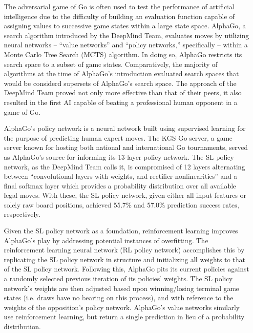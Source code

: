 \documentclass[12pt]{article}
\begin{document}
The adversarial game of Go is often used to test the performance of artificial
intelligence due to the difficulty of building an evaluation function capable
of assigning values to successive game states within a large state space. 
AlphaGo, a search algorithm introduced by the DeepMind Team, evaluates moves by
utilizing neural networks -- ``value networks'' and ``policy
networks,'' specifically -- within a Monte Carlo Tree Search (MCTS) algorithm. 
In doing so, AlphaGo restricts its search space to a subset of game states.
Comparatively, the majority of algorithms at the time of AlphaGo's introduction
evaluated search spaces that would be considerd supersets of AlphaGo's search
space. The approach of the DeepMind Team proved not only more effective than
that of their peers, it also resulted in the first AI capable of beating a
professional human opponent in a game of Go.

AlphaGo's policy network is a neural network built using supervised learning
for the purpose of predicting human expert moves. The KGS Go server, a game
server known for hosting both national and international Go tournaments,
served as AlphaGo's source for informing its 13-layer policy network. The
SL policy network, as the DeepMind Team calls it, is compromised of 12 layers
alternating between ``convolutional layers with weights, and rectifier 
nonlinearities'' and a final softmax layer which provides a
probability distribution over all available legal moves. With these, the SL
policy network, given either all input features or solely raw board positions,
achieved 55.7\% and 57.0\% prediction success rates, respectively. 

Given the SL policy network as a foundation, reinforcement learning improves 
AlphaGo's play by addressing potential instances of overfitting.
The reinforcement learning neural network (RL policy network)
accomplishes this by replicating the SL policy network in structure
and initializing all weights to that of the SL policy network. Following this,
AlphaGo pits its current policies against a randomly selected previous
iteration of its policies' weights. The SL policy network's weights are then 
adjusted based upon winning/losing terminal game states (i.e. draws have no
bearing on this process), and with reference to the weights of the opposition's
policy network. AlphaGo's value networks similarly use reinforcement learning,
but return a single prediction in lieu of a probability distribution.
\end{document}
